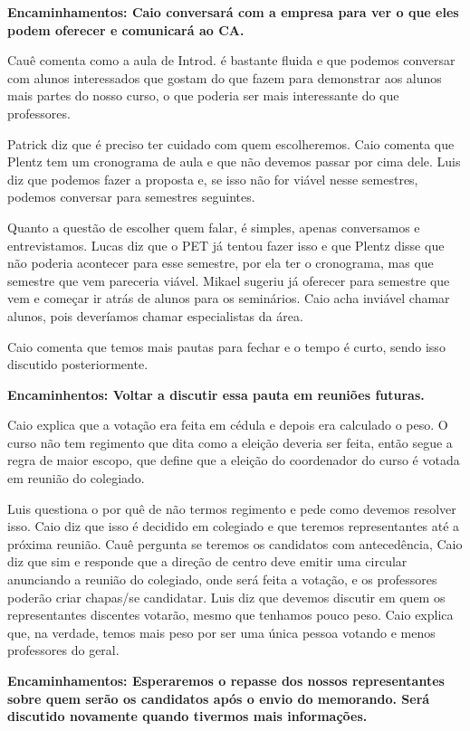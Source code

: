 \documentclass{ata-calico}
\begin{document}
\textbf{Encaminhamentos: Caio conversará com a empresa para ver o que eles podem oferecer e comunicará ao CA.}

Cauê comenta como a aula de Introd. é bastante fluida e que podemos conversar com alunos interessados que gostam do que fazem para demonstrar aos alunos mais partes do nosso curso, o que poderia ser mais interessante do que professores. 

Patrick diz que é preciso ter cuidado com quem escolheremos. Caio comenta que Plentz tem um cronograma de aula e que não devemos passar por cima dele. Luis diz que podemos fazer a proposta e, se isso não for viável nesse semestres, podemos conversar para semestres seguintes.

Quanto a questão de escolher quem falar, é simples, apenas conversamos e entrevistamos. Lucas diz que o PET já tentou fazer isso e que Plentz disse que não poderia acontecer para esse semestre, por ela ter o cronograma, mas que semestre que vem pareceria viável. Mikael sugeriu já oferecer para semestre que vem e começar ir atrás de alunos para os seminários. Caio acha inviável chamar alunos, pois deveríamos chamar especialistas da área. 

Caio comenta que temos mais pautas para fechar e o tempo é curto, sendo isso discutido posteriormente.\newline

\textbf{Encaminhentos: Voltar a discutir essa pauta em reuniões futuras.}


Caio explica que a votação era feita em cédula e depois era calculado o peso. O curso não tem regimento que dita como a eleição deveria ser feita, então segue a regra de maior escopo, que define que a eleição do coordenador do curso é votada em reunião do colegiado. 

Luis questiona o por quê de não termos regimento e pede como devemos resolver isso. Caio diz que isso é decidido em colegiado e que teremos representantes até a próxima reunião. Cauê pergunta se teremos os candidatos com antecedência, Caio diz que sim e responde que a direção de centro deve emitir uma circular anunciando a reunião do colegiado, onde será feita a votação, e os professores poderão criar chapas/se candidatar. Luis diz que devemos discutir em quem os representantes discentes votarão, mesmo que tenhamos pouco peso. Caio explica que, na verdade, temos mais peso por ser uma única pessoa votando e menos professores do geral.\newline

\textbf{Encaminhamentos: Esperaremos o repasse dos nossos representantes sobre quem serão os candidatos após o envio do memorando. Será discutido novamente quando tivermos mais informações.}

\end{document}
